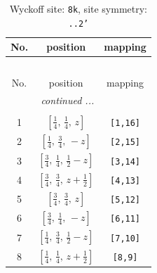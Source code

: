 \documentclass[fleqn,8pt]{jsarticle}
\begin{document}
\begin{longtable}{ccc}
\caption{Wyckoff site: {\tt 8k}, site symmetry: {\tt ..2'}}
 \\
 \hline \hline
No. & position & mapping \\ \hline \endfirsthead

\multicolumn{2}{l}{\tablename\ \thetable{}} \\
 \hline \hline
No. & position & mapping \\ \hline \endhead

 \hline \hline
\multicolumn{2}{r}{\footnotesize\it continued ...} \\ \endfoot

 \hline \hline
\multicolumn{2}{r}{} \\ \endlastfoot

1 & $\left[ \frac{1}{4},\, \frac{1}{4},\, z \right]$ & {\tt [1,16]} \\ \hline
2 & $\left[ \frac{1}{4},\, \frac{3}{4},\, - z \right]$ & {\tt [2,15]} \\ \hline
3 & $\left[ \frac{3}{4},\, \frac{1}{4},\, \frac{1}{2} - z \right]$ & {\tt [3,14]} \\ \hline
4 & $\left[ \frac{3}{4},\, \frac{3}{4},\, z + \frac{1}{2} \right]$ & {\tt [4,13]} \\ \hline
5 & $\left[ \frac{3}{4},\, \frac{3}{4},\, z \right]$ & {\tt [5,12]} \\ \hline
6 & $\left[ \frac{3}{4},\, \frac{1}{4},\, - z \right]$ & {\tt [6,11]} \\ \hline
7 & $\left[ \frac{1}{4},\, \frac{3}{4},\, \frac{1}{2} - z \right]$ & {\tt [7,10]} \\ \hline
8 & $\left[ \frac{1}{4},\, \frac{1}{4},\, z + \frac{1}{2} \right]$ & {\tt [8,9]} \\
\end{longtable}
\renewcommand{\arraystretch}{1.2}
\end{document}
